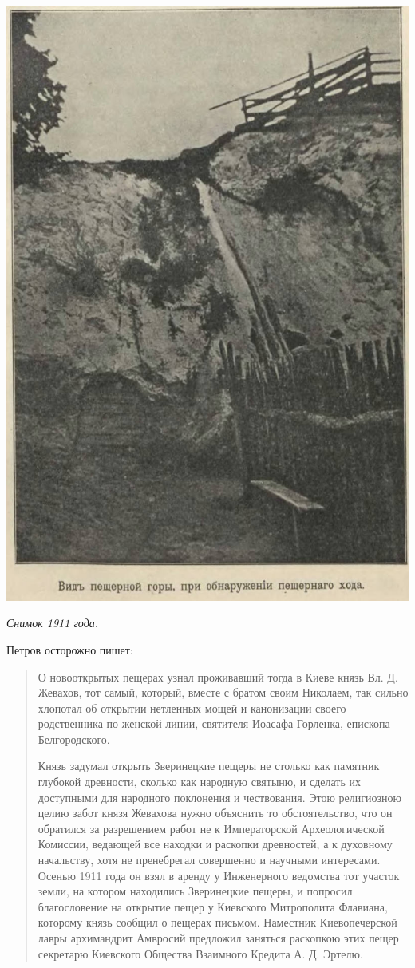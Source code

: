 \begin{center}
\includegraphics[width=0.90\linewidth]{chast-colebanie-osnov/nachalo/zverp-02.jpg}

\textit{Снимок 1911 года.}
\end{center}

\newpage

Петров осторожно пишет:

\begin{quotation}
О новооткрытых пещерах узнал проживавший тогда в Киеве князь Вл. Д. Жевахов, тот самый, который, вместе с братом своим Николаем, так сильно хлопотал об открытии нетленных мощей и канонизации своего родственника по женской линии, святителя Иоасафа Горленка, епископа Белгородского.

Князь задумал открыть Зверинецкие пещеры не столько как памятник глубокой древности, сколько как народную святыню, и сделать их доступными для народного поклонения и чествования. Этою религиозною целию забот князя Жевахова нужно объяснить то обстоятельство, что он обратился за разрешением работ не к Императорской Археологической Комиссии, ведающей все находки и раскопки древностей, а к духовному начальству, хотя не пренебрегал совершенно и научными интересами. Осенью 1911 года он взял в аренду у Инженерного ведомства тот участок земли, на котором находились Зверинецкие пещеры, и попросил благословение на открытие пещер у Киевского Митрополита Флавиана, которому князь сообщил о пещерах письмом. Наместник Киевопечерской лавры архимандрит Амвросий предложил заняться раскопкою этих пещер секретарю Киевского Общества Взаимного Кредита А. Д. Эртелю.
\end{quotation}

